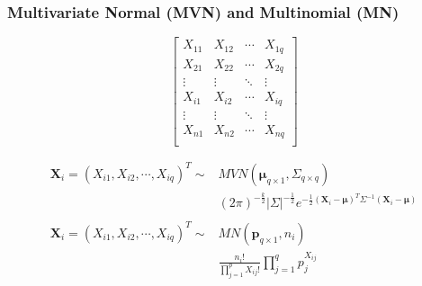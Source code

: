 \documentclass[xcolor={dvipsnames}]{beamer}
\begin{document}
\frame
{
 \frametitle{Multivariate Normal (MVN) and Multinomial (MN)}

$$
\left[\begin{array}{cccc}
X_{11}&X_{12} & \cdots & X_{1q} \\
X_{21}&X_{22} & \cdots & X_{2q} \\
\vdots &\vdots &\ddots&\vdots \\\hline
X_{i1}&X_{i2} & \cdots & X_{iq} \\ \hline
\vdots &\vdots &\ddots&\vdots \\
X_{n1}&X_{n2} & \cdots & X_{nq} \\
\end{array}\right]
$$

\begin{align*}
{\boldsymbol X}_i ={} (X_{i1}, X_{i2}, \cdots, X_{iq})^T \sim & MVN({\boldsymbol \mu}_{q\times1},\Sigma_{q \times q}) \\
{}& (2\pi)^{-\frac{k}{2}} |\Sigma|^{-\frac{1}{2}} e^{-\frac{1}{2} ({\boldsymbol X_i} - {\boldsymbol \mu})^T \Sigma^{-1}({\boldsymbol X_i} - {\boldsymbol \mu})}\\
{}\\
{\boldsymbol X}_i ={} (X_{i1}, X_{i2}, \cdots, X_{iq})^T \sim & MN({\boldsymbol p}_{q\times1}, n_i)\\
{}& \frac{n_i!}{\prod_{j=1}^pX_{ij}!} \prod_{j=1}^q p_j^{X_{ij}}
\end{align*}




}
\end{document}
